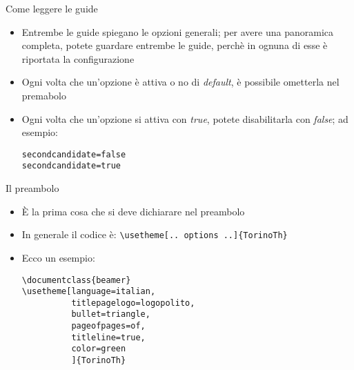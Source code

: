 \begin{frame}[t,fragile]{Come leggere le guide}
\begin{itemize}
\item Entrembe le guide spiegano le opzioni generali; per avere una panoramica completa, potete guardare entrembe le guide, perchè in ognuna di esse è riportata la configurazione
\item Ogni volta che un'opzione è attiva o no di \emph{default}, è possibile ometterla nel premabolo
\item Ogni volta che un'opzione si attiva con \emph{true}, potete disabilitarla con \emph{false}; ad esempio:
\begin{verbatim}
secondcandidate=false 
secondcandidate=true 
\end{verbatim}
\end{itemize}
\end{frame}

\begin{frame}[t,fragile]{Il preambolo}
\begin{itemize}
\item \`E la prima cosa che si deve dichiarare nel preambolo
\item In generale il codice è: \verb!\usetheme[.. options ..]{TorinoTh}!
\item Ecco un esempio:
\begin{verbatim}
\documentclass{beamer}
\usetheme[language=italian,
          titlepagelogo=logopolito,
          bullet=triangle,
          pageofpages=of,
          titleline=true,
          color=green
          ]{TorinoTh}
\end{verbatim}
\end{itemize}
\end{frame}

